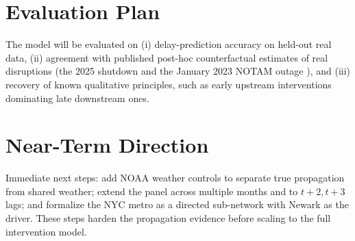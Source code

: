 \documentclass[11pt]{article}
\begin{document}
\section{Evaluation Plan}
The model will be evaluated on (i) delay-prediction accuracy on held-out real
data, (ii) agreement with published post-hoc counterfactual estimates of real
disruptions (the 2025 shutdown \cite{richmondfed2025} and the January 2023 NOTAM
outage \cite{icao2023notam}), and (iii) recovery of known qualitative principles,
such as early upstream interventions dominating late downstream ones.

\section{Near-Term Direction}
Immediate next steps: add NOAA weather controls to separate true propagation from
shared weather; extend the panel across multiple months and to $t{+}2,t{+}3$ lags;
and formalize the NYC metro as a directed sub-network with Newark as the driver.
These steps harden the propagation evidence before scaling to the full
intervention model.
\end{document}
